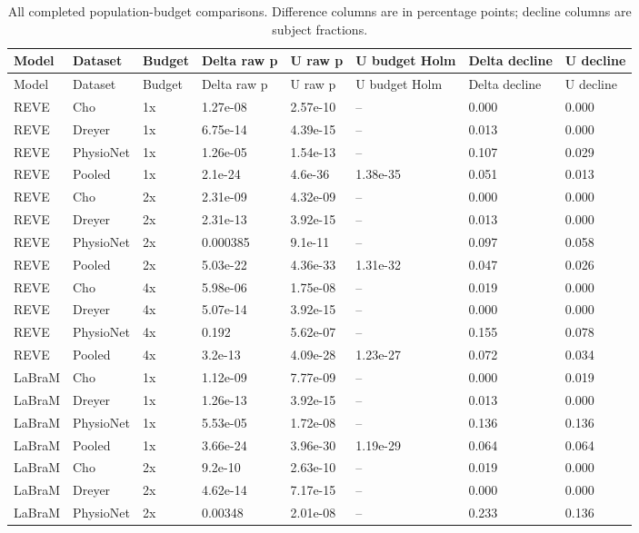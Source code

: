 \begin{longtable}{llllllll}
\caption{All completed population-budget comparisons. Difference columns are in percentage points; decline columns are subject fractions.}\label{tab:budget_all_tests}\\
\toprule
Model & Dataset & Budget & Delta raw p & U raw p & U budget Holm & Delta decline & U decline \\
\midrule
\endfirsthead
\toprule
Model & Dataset & Budget & Delta raw p & U raw p & U budget Holm & Delta decline & U decline \\
\midrule
\endhead
REVE & Cho & 1x & 1.27e-08 & 2.57e-10 & -- & 0.000 & 0.000 \\
REVE & Dreyer & 1x & 6.75e-14 & 4.39e-15 & -- & 0.013 & 0.000 \\
REVE & PhysioNet & 1x & 1.26e-05 & 1.54e-13 & -- & 0.107 & 0.029 \\
REVE & Pooled & 1x & 2.1e-24 & 4.6e-36 & 1.38e-35 & 0.051 & 0.013 \\
REVE & Cho & 2x & 2.31e-09 & 4.32e-09 & -- & 0.000 & 0.000 \\
REVE & Dreyer & 2x & 2.31e-13 & 3.92e-15 & -- & 0.013 & 0.000 \\
REVE & PhysioNet & 2x & 0.000385 & 9.1e-11 & -- & 0.097 & 0.058 \\
REVE & Pooled & 2x & 5.03e-22 & 4.36e-33 & 1.31e-32 & 0.047 & 0.026 \\
REVE & Cho & 4x & 5.98e-06 & 1.75e-08 & -- & 0.019 & 0.000 \\
REVE & Dreyer & 4x & 5.07e-14 & 3.92e-15 & -- & 0.000 & 0.000 \\
REVE & PhysioNet & 4x & 0.192 & 5.62e-07 & -- & 0.155 & 0.078 \\
REVE & Pooled & 4x & 3.2e-13 & 4.09e-28 & 1.23e-27 & 0.072 & 0.034 \\
LaBraM & Cho & 1x & 1.12e-09 & 7.77e-09 & -- & 0.000 & 0.019 \\
LaBraM & Dreyer & 1x & 1.26e-13 & 3.92e-15 & -- & 0.013 & 0.000 \\
LaBraM & PhysioNet & 1x & 5.53e-05 & 1.72e-08 & -- & 0.136 & 0.136 \\
LaBraM & Pooled & 1x & 3.66e-24 & 3.96e-30 & 1.19e-29 & 0.064 & 0.064 \\
LaBraM & Cho & 2x & 9.2e-10 & 2.63e-10 & -- & 0.019 & 0.000 \\
LaBraM & Dreyer & 2x & 4.62e-14 & 7.17e-15 & -- & 0.000 & 0.000 \\
LaBraM & PhysioNet & 2x & 0.00348 & 2.01e-08 & -- & 0.233 & 0.136 \\

\end{longtable}
